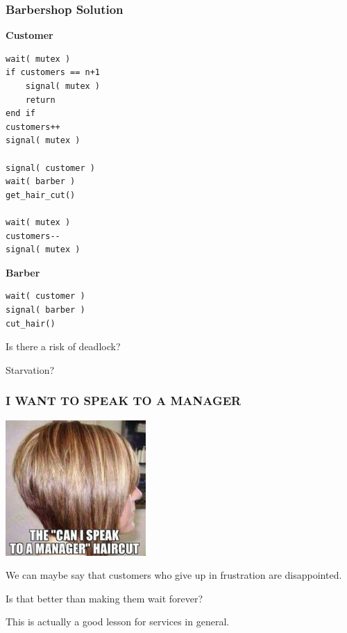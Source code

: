 \begin{frame}[fragile]
	\frametitle{Barbershop Solution}

	\begin{multicols}{2}
		\textbf{Customer}
		\begin{lstlisting}
wait( mutex )
if customers == n+1
    signal( mutex )
    return
end if
customers++
signal( mutex )

signal( customer )
wait( barber )
get_hair_cut()

wait( mutex )
customers--
signal( mutex )
\end{lstlisting}
		\columnbreak
		\textbf{Barber}
		\begin{lstlisting}
wait( customer )
signal( barber )
cut_hair()
  \end{lstlisting}
	\end{multicols}

	Is there a risk of deadlock?

	Starvation?

\end{frame}


\begin{frame}
	\frametitle{I WANT TO SPEAK TO A MANAGER}
	
	\begin{center}
	\includegraphics[width=0.4\textwidth]{images/manager.jpg}
	\end{center}

	We can maybe say that customers who give up in frustration are disappointed.

	Is that better than making them wait forever?

	This is actually a good lesson for services in general.

\end{frame}


